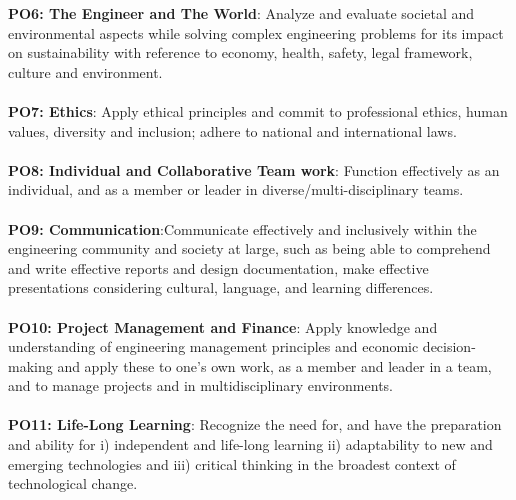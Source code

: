 \documentclass[12pt,a4paper,titlepage]{report}
\begin{document}
	\textbf{PO6: The Engineer and The World}: Analyze and evaluate societal and environmental aspects while solving complex engineering problems for its impact on sustainability with reference to economy, health, safety, legal framework, culture and environment. \\ \\
	\textbf{PO7: Ethics}: Apply ethical principles and commit to professional ethics, human values, diversity and inclusion; adhere to national and international laws.  \\ \\
	\textbf{PO8: Individual and Collaborative Team work}: Function effectively as an individual, and as a member or leader in diverse/multi-disciplinary teams.  \\ \\
	\textbf{PO9: Communication}:Communicate effectively and inclusively within the engineering community and society at large, such as being able to comprehend and write effective reports and design documentation, make effective presentations considering cultural, language, and learning differences. \\ \\
	\textbf{PO10: Project Management and Finance}: Apply knowledge and understanding of engineering management principles and economic decision-making and apply these to one’s own work, as a member and leader in a team, and to manage projects and in multidisciplinary environments. \\ \\
	\textbf{PO11: Life-Long Learning}: Recognize the need for, and have the preparation and ability for i) independent and life-long learning ii) adaptability to new and emerging technologies and iii) critical thinking in the broadest context of technological change.  \\ \\
\end{document}
